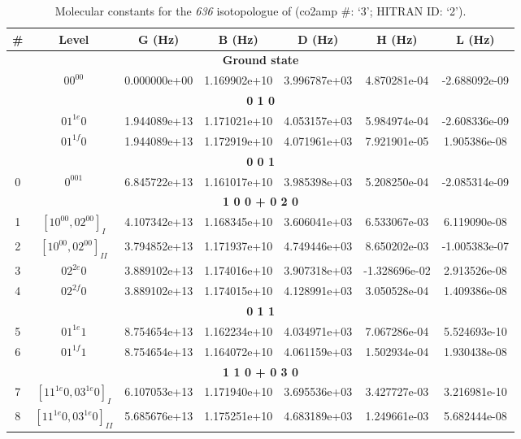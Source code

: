 \begin{table}[h!]
\caption{Molecular constants for the \textit{636} isotopologue of  (co2amp \#: ‘3’; HITRAN ID: ‘2’).}
\label{table:constants_636}
\centering
\begin{tabular}{|c|c|c|c|c|c|c|}
\hline
\textbf{\#} & \textbf{Level} & \textbf{G (Hz)} & \textbf{B (Hz)} & \textbf{D (Hz)} & \textbf{H (Hz)} & \textbf{L (Hz)} \\ \hline
\multicolumn{7}{|c|}{\textbf{Ground state}} \\ \hline
 & $00^00$ & 0.000000e+00 & 1.169902e+10 & 3.996787e+03 & 4.870281e-04 & -2.688092e-09 \\ \hline
\multicolumn{7}{|c|}{\textbf{0 1 0}} \\ \hline
 & $01^{1e}0$ & 1.944089e+13 & 1.171021e+10 & 4.053157e+03 & 5.984974e-04 & -2.608336e-09 \\ \hline
 & $01^{1f}0$ & 1.944089e+13 & 1.172919e+10 & 4.071961e+03 & 7.921901e-05 & 1.905386e-08 \\ \hline
\multicolumn{7}{|c|}{\textbf{0 0 1}} \\ \hline
0 & $0^001$ & 6.845722e+13 & 1.161017e+10 & 3.985398e+03 & 5.208250e-04 & -2.085314e-09 \\ \hline
\multicolumn{7}{|c|}{\textbf{1 0 0 + 0 2 0}} \\ \hline
1 & $[10^00, 02^00]_{I}$ & 4.107342e+13 & 1.168345e+10 & 3.606041e+03 & 6.533067e-03 & 6.119090e-08 \\ \hline
2 & $[10^00, 02^00]_{II}$ & 3.794852e+13 & 1.171937e+10 & 4.749446e+03 & 8.650202e-03 & -1.005383e-07 \\ \hline
3 & $02^{2e}0$ & 3.889102e+13 & 1.174016e+10 & 3.907318e+03 & -1.328696e-02 & 2.913526e-08 \\ \hline
4 & $02^{2f}0$ & 3.889102e+13 & 1.174015e+10 & 4.128991e+03 & 3.050528e-04 & 1.409386e-08 \\ \hline
\multicolumn{7}{|c|}{\textbf{0 1 1}} \\ \hline
5 & $01^{1e}1$ & 8.754654e+13 & 1.162234e+10 & 4.034971e+03 & 7.067286e-04 & 5.524693e-10 \\ \hline
6 & $01^{1f}1$ & 8.754654e+13 & 1.164072e+10 & 4.061159e+03 & 1.502934e-04 & 1.930438e-08 \\ \hline
\multicolumn{7}{|c|}{\textbf{1 1 0 + 0 3 0}} \\ \hline
7 & $[11^{1e}0, 03^{1e}0]_{I}$ & 6.107053e+13 & 1.171940e+10 & 3.695536e+03 & 3.427727e-03 & 3.216981e-10 \\ \hline
8 & $[11^{1e}0, 03^{1e}0]_{II}$ & 5.685676e+13 & 1.175251e+10 & 4.683189e+03 & 1.249661e-03 & 5.682444e-08 \\ \hline

\end{tabular}
\end{table}
